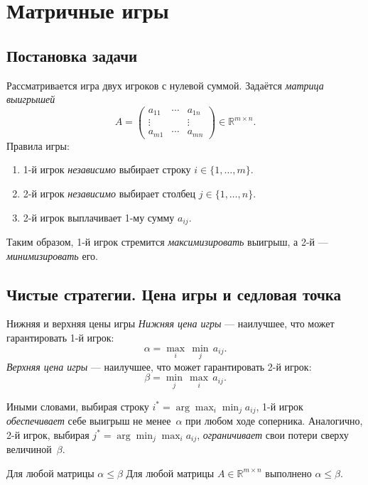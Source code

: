 
\section{Матричные игры}

\subsection{Постановка задачи}

Рассматривается игра двух игроков с нулевой суммой. Задаётся \emph{матрица выигрышей}
\[
A = \begin{pmatrix} a_{11} & \cdots & a_{1n} \\ \vdots & & \vdots \\ a_{m1} & \cdots & a_{mn} \end{pmatrix}
\in \mathbb{R}^{m \times n}.
\]
Правила игры:
\begin{enumerate}
	\item 1-й игрок \emph{независимо} выбирает строку $i \in \{1, \ldots, m\}$.
	\item 2-й игрок \emph{независимо} выбирает столбец $j \in \{1, \ldots, n\}$.
	\item 2-й игрок выплачивает 1-му сумму $a_{ij}$.
\end{enumerate}
Таким образом, 1-й игрок стремится \emph{максимизировать} выигрыш, а 2-й --- \emph{минимизировать} его.

\subsection{Чистые стратегии. Цена игры и седловая точка}

\begin{Definition}{Нижняя и верхняя цены игры}{}
	\emph{Нижняя цена игры} --- наилучшее, что может гарантировать 1-й игрок:
	\[
	\alpha = \max_{i}\,\min_{j}\, a_{ij}.
	\]
	\emph{Верхняя цена игры} --- наилучшее, что может гарантировать 2-й игрок:
	\[
	\beta = \min_{j}\,\max_{i}\, a_{ij}.
	\]
\end{Definition}

Иными словами, выбирая строку $i^* = \arg\max_i \min_j a_{ij}$, 1-й игрок \emph{обеспечивает} себе выигрыш не менее~$\alpha$ при любом ходе соперника. Аналогично, 2-й игрок, выбирая $j^* = \arg\min_j \max_i a_{ij}$, \emph{ограничивает} свои потери сверху величиной~$\beta$.

\begin{Theorem}{Для любой матрицы $\alpha \leq \beta$}{}
	Для любой матрицы $A \in \mathbb{R}^{m \times n}$ выполнено $\alpha \leq \beta$.
\end{Theorem}

